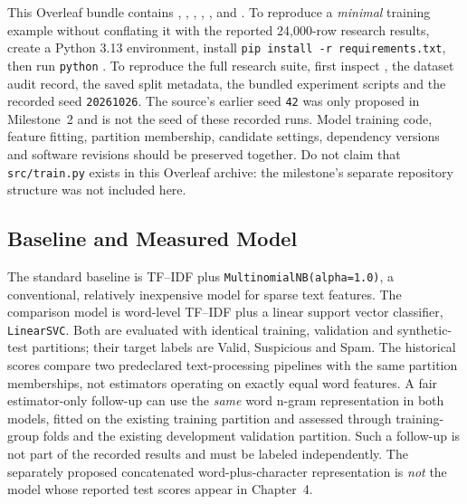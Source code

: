 This Overleaf bundle contains , , , , , and . To reproduce a \emph{minimal} training example without conflating it with the reported 24,000-row research results, create a Python 3.13 environment, install \texttt{pip install -r requirements.txt}, then run \texttt{python} . To reproduce the full research suite, first inspect , the dataset audit record, the saved split metadata, the bundled experiment scripts and the recorded seed \texttt{20261026}. The source's earlier seed \texttt{42} was only proposed in Milestone~2 and is not the seed of these recorded runs. Model training code, feature fitting, partition membership, candidate settings, dependency versions and software revisions should be preserved together. Do not claim that \texttt{src/train.py} exists in this Overleaf archive: the milestone's separate repository structure was not included here.

\subsection{Baseline and Measured Model}
The standard baseline is TF--IDF plus \texttt{MultinomialNB(alpha=1.0)}, a conventional, relatively inexpensive model for sparse text features. The comparison model is word-level TF--IDF plus a linear support vector classifier, \texttt{LinearSVC}. Both are evaluated with identical training, validation and synthetic-test partitions; their target labels are Valid, Suspicious and Spam. The historical scores compare two predeclared text-processing pipelines with the same partition memberships, not estimators operating on exactly equal word features. A fair estimator-only follow-up can use the \emph{same} word n-gram representation in both models, fitted on the existing training partition and assessed through training-group folds and the existing development validation partition. Such a follow-up is not part of the recorded results and must be labeled independently. The separately proposed concatenated word-plus-character representation is \emph{not} the model whose reported test scores appear in Chapter~4.

